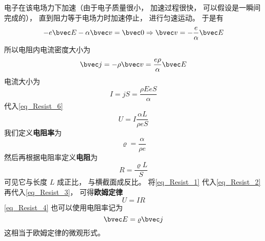 电子在该电场力下加速（由于电子质量很小， 加速过程很快， 可以假设是一瞬间完成的）， 直到阻力等于电场力时加速停止， 进行匀速运动。 于是有
\begin{equation}
-e\bvec E - \alpha \bvec v = \bvec 0 \Rightarrow \bvec v = -\frac{e}{\alpha}\bvec E
\end{equation}
所以电阻内电流密度大小为
\begin{equation}\label{eq_Resist_4}
\bvec j = -\rho \bvec v = \frac{e\rho}{\alpha}\bvec E
\end{equation}
电流大小为
\begin{equation}
I = jS = \frac{\rho EeS}{\alpha}
\end{equation}
代入\autoref{eq_Resist_6} 
\begin{equation}\label{eq_Resist_3}
U = I \frac{\alpha L}{\rho eS}
\end{equation}
我们定义\textbf{电阻率}为
\begin{equation}\label{eq_Resist_1}
\varrho = \frac{\alpha}{\rho e}
\end{equation}
然后再根据电阻率定义\textbf{电阻}为
\begin{equation}\label{eq_Resist_2}
R = \frac{\varrho L}{S}
\end{equation}
可见它与长度 $L$ 成正比， 与横截面成反比。 将\autoref{eq_Resist_1} 代入\autoref{eq_Resist_2} 再代入\autoref{eq_Resist_3}， 可得\textbf{欧姆定律}
\begin{equation}
U = IR
\end{equation}
\autoref{eq_Resist_4} 也可以使用电阻率记为
\begin{equation}
\bvec E = \varrho\bvec j
\end{equation}
这相当于欧姆定律的微观形式。

